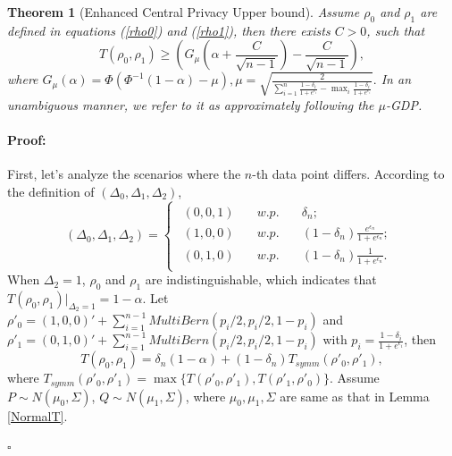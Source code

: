 \documentclass[letterpaper]{article} %
\newtheorem{theorem}{Theorem}
\newenvironment{proof}{\paragraph{Proof:}}{\hfill$\square$}
\begin{document}
\begin{theorem}[Enhanced Central Privacy Upper bound] \label{thm:GDPdistance}
Assume $\rho_0$ and $\rho_1$ are defined in equations (\ref{rho0}) and (\ref{rho1}), then there exists $C>0$, such that
\begin{equation}
T(\rho_0,\rho_1) \ge \left(G_\mu\left({\alpha+\frac{C}{\sqrt{n-1}}}\right)-\frac{C}{\sqrt{n-1}}\right)
,
\end{equation}
where
$G_\mu(\alpha) = \Phi(\Phi^{-1}(1-\alpha)-\mu),
\mu = \sqrt{\frac{2}{\sum_{i=1}^{n} \frac{1-\delta_i}{1+e^{\epsilon_i}}-\max_{i}{\frac{1-\delta_{i}}{1+e^{\epsilon_{i}}}}}}.
$
In an unambiguous manner, we refer to it as approximately following the $\mu$-GDP.
\end{theorem}
\begin{proof}
First, let's analyze the scenarios where the $n$-th data point differs.
According to the definition of $(\Delta_0,\Delta_1,\Delta_2)$,
\begin{equation}
(\Delta_0,\Delta_1,\Delta_2) =
\begin{cases}
    \begin{array}{lll}
        (0,0,1) & \quad w.p. & \quad \delta_{n}; \\
        (1,0,0) &  \quad w.p. & \quad (1-\delta_{n})\frac{e^{\epsilon_{n}}}{1+e^{\epsilon_{n}}}; \\
        (0,1,0) & \quad  w.p. & \quad (1-\delta_{n})\frac{1}{{1+e^{\epsilon_{n}}}}.
    \end{array}
\end{cases}
\end{equation}
When $\Delta_2 = 1$, $\rho_0$ and $\rho_1$ are  indistinguishable, which indicates that $T(\rho_0,\rho_1)|_{\Delta_2=1} = 1-\alpha$.
 Let $\rho'_0=(1,0,0)'+\sum_{i=1}^{n-1}MultiBern\left(p_i/2,p_i/2,1-p_i\right)$ and $\rho'_1=(0,1,0)'+\sum_{i=1}^{n-1}MultiBern\left(p_i/2,p_i/2,1-p_i\right)$ with $p_i =
 \frac{1-\delta_i}{1+e^{\epsilon_i}}
 $, then
\begin{equation}
T(\rho_0,\rho_1) = \delta_{n}(1-\alpha)+(1-\delta_{n})T_{symm}(\rho'_0,\rho'_1),
\end{equation}
where $T_{symm}(\rho'_0,\rho'_1) = \max \{T(\rho'_0,\rho'_1),T(\rho'_1,\rho'_0)\}$.
Assume $P \sim N(\mu_0,\Sigma)$, $Q \sim N(\mu_1,\Sigma)$, where $\mu_0,\mu_1,\Sigma$ are same as that in Lemma \ref{NormalT}.

\end{proof}
\end{document}
